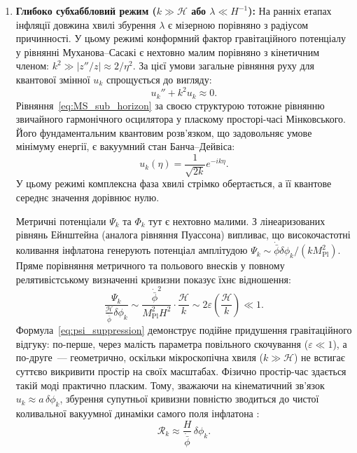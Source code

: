 \begin{enumerate}
\item \textbf{Глибоко субхаббловий режим ($k \gg \mathcal{H}$ або $\lambda \ll H^{-1}$):}
  На ранніх етапах інфляції довжина хвилі збурення $\lambda$ є мізерною порівняно з радіусом причинності. У цьому режимі конформний фактор гравітаційного потенціалу у рівнянні Муханова--Сасакі є нехтовно малим порівняно з кінетичним членом: $k^2 \gg |z''/z| \approx 2/\eta^2$. За цієї умови загальне рівняння руху для квантової змінної $u_k$ спрощується до вигляду:
  \begin{equation}\label{eq:MS_sub_horizon}
    u_k'' + k^2 u_k \approx 0.
  \end{equation}
  Рівняння~\eqref{eq:MS_sub_horizon} за своєю структурою тотожне рівнянню звичайного гармонічного осцилятора у пласкому просторі-часі Мінковського. Його фундаментальним квантовим розв'язком, що задовольняє умове мінімуму енергії, є вакуумний стан Банча--Дейвіса:
  \begin{equation}\label{eq:bunch_davies}
    u_k(\eta) = \frac{1}{\sqrt{2k}} e^{-ik\eta}.
  \end{equation}
  У цьому режимі комплексна фаза хвилі стрімко обертається, а її квантове середнє значення дорівнює нулю.

  Метричні потенціали $\Psi_k$ та $\Phi_k$ тут є нехтовно малими. З лінеаризованих рівнянь Ейнштейна (аналога рівняння Пуассона) випливає, що високочастотні коливання інфлатона генерують потенціал амплітудою $\Psi_k \sim \dot{\bar{\phi}}\delta\phi_k / (k M_{\mathrm{Pl}}^2)$. Пряме порівняння метричного та польового внесків у повному релятивістському визначенні кривизни показує їхнє відношення:
  \begin{equation}\label{eq:psi_suppression}
    \frac{\Psi_k}{\frac{\mathcal{H}}{\dot{\bar{\phi}}}\delta\phi_k} \sim \frac{\dot{\bar{\phi}}^2}{M_{\mathrm{Pl}}^2 H^2} \cdot \frac{\mathcal{H}}{k} \sim 2\varepsilon \left(\frac{\mathcal{H}}{k}\right) \ll 1.
  \end{equation}
  Формула~\eqref{eq:psi_suppression} демонструє подійне придушення гравітаційного відгуку: по-перше, через малість параметра повільного скочування ($\varepsilon \ll 1$), а по-друге~--- геометрично, оскільки мікроскопічна хвиля ($k \gg \mathcal{H}$) не встигає суттєво викривити простір на своїх масштабах. Фізично простір-час здається такій моді практично пласким. Тому, зважаючи на кінематичний зв'язок $u_k \approx a\,\delta\phi_k$, збурення супутньої кривизни повністю зводиться до чистої коливальної вакуумної динаміки самого поля інфлатона \cite{mukhanov_2005}:
  \begin{equation}\label{eq:curvature_perturbation_sub}
    \mathcal{R}_k \approx \frac{H}{\dot{\bar{\phi}}}\,\delta\phi_k.
  \end{equation}


\end{enumerate}

